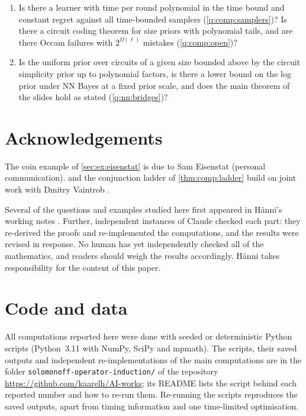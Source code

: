\begin{enumerate}[leftmargin=*,label=(\arabic*)]
\item Is there a learner with time per round polynomial in the time bound and constant regret against all time-bounded samplers (\cref{q:comp:samplers})? Is there a circuit coding theorem for size priors with polynomial tails, and are there Occam failures with $2^{\Omega(\ell)}$ mistakes (\cref{q:comp:open})?
\item Is the uniform prior over circuits of a given size bounded above by the circuit simplicity prior up to polynomial factors, is there a lower bound on the log prior under NN Bayes at a fixed prior scale, and does the main theorem of the slides hold as stated (\cref{q:nn:bridges})?
\end{enumerate}

\section*{Acknowledgements}
The coin example of \cref{sec:ex:eisenstat} is due to Sam Eisenstat (personal communication).  and the conjunction ladder of \cref{thm:comp:ladder} build on joint work with Dmitry Vaintrob \citep{vaintrobhanni2026nnbayes}.

Several of the questions and examples studied here first appeared in H\"anni's working notes \citep{hanni2026notes}. Further, independent instances of Claude checked each part: they re-derived the proofs and re-implemented the computations, and the results were revised in response. No human has yet independently checked all of the mathematics, and readers should weigh the results accordingly. H\"anni takes responsibility for the content of this paper.

\section*{Code and data}
All computations reported here were done with seeded or deterministic Python scripts (Python~3.11 with NumPy, SciPy and mpmath). The scripts, their saved outputs and independent re-implementations of the main computations are in the folder \texttt{solomonoff-operator-induction/} of the repository \url{https://github.com/kaarelh/AI-works}; its README lists the script behind each reported number and how to re-run them. Re-running the scripts reproduces the saved outputs, apart from timing information and one time-limited optimisation.
